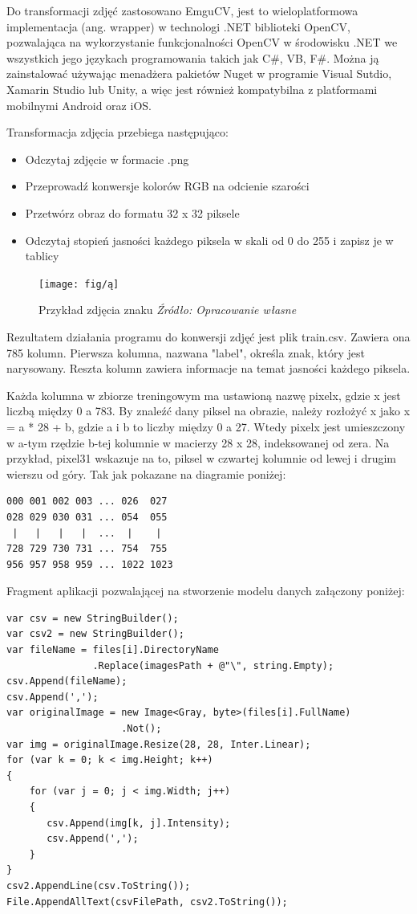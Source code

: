 \documentclass[brudnopis]{xmgr}
\begin{document}
Do transformacji zdjęć zastosowano EmguCV\cite{18}, jest to wieloplatformowa implementacja (ang. wrapper) w technologi .NET biblioteki OpenCV, pozwalająca na wykorzystanie funkcjonalności OpenCV\cite{21} w środowisku .NET we wszystkich jego językach programowania takich jak C\#, VB, F\#\cite{1}. Można ją zainstalować używając menadżera pakietów Nuget w programie Visual Sutdio, Xamarin Studio lub Unity, a więc jest również kompatybilna z platformami mobilnymi Android oraz iOS.

Transformacja zdjęcia przebiega następująco:
\begin{itemize}
\item
Odczytaj zdjęcie w formacie .png
\item
Przeprowadź konwersje kolorów RGB na odcienie szarości
\item
Przetwórz obraz do formatu 32 x 32 piksele
\item
Odczytaj stopień jasności każdego piksela w skali od 0 do 255 i zapisz je w tablicy
\end{itemize}

\begin{figure}[!tbh]
\centering
\texttt{[image: fig/ą]}
\caption{Przykład zdjęcia znaku \emph{Źródło: Opracowanie własne}}
\end{figure}
Rezultatem działania programu do konwersji zdjęć jest plik train.csv. Zawiera ona 785 kolumn. Pierwsza kolumna, nazwana "label", określa znak, który jest narysowany. Reszta kolumn zawiera informacje na temat jasności każdego piksela.

Każda kolumna w zbiorze treningowym ma ustawioną nazwę pixelx, gdzie x jest liczbą między 0 a 783. By znaleźć dany piksel na obrazie, należy rozłożyć x jako x = a * 28 + b, gdzie a i b to liczby między 0 a 27. Wtedy pixelx jest umieszczony w a-tym rzędzie b-tej kolumnie w macierzy 28 x 28, indeksowanej od zera. Na przykład, pixel31 wskazuje na to, piksel w czwartej kolumnie od lewej i drugim wierszu od góry. Tak jak pokazane na diagramie poniżej:

\begin{lstlisting}
000 001 002 003 ... 026  027
028 029 030 031 ... 054  055
 |   |   |   |  ...  |    |
728 729 730 731 ... 754  755
956 957 958 959 ... 1022 1023 
\end{lstlisting} 
\newpage

Fragment aplikacji pozwalającej na stworzenie modelu danych załączony poniżej:

\begin{verbatim}
var csv = new StringBuilder();
var csv2 = new StringBuilder();
var fileName = files[i].DirectoryName
               .Replace(imagesPath + @"\", string.Empty);
csv.Append(fileName);
csv.Append(',');
var originalImage = new Image<Gray, byte>(files[i].FullName)
                    .Not();
var img = originalImage.Resize(28, 28, Inter.Linear);
for (var k = 0; k < img.Height; k++)
{
    for (var j = 0; j < img.Width; j++)
    {
       csv.Append(img[k, j].Intensity);
       csv.Append(',');
    }
}
csv2.AppendLine(csv.ToString());
File.AppendAllText(csvFilePath, csv2.ToString());
\end{verbatim}
\end{document}

